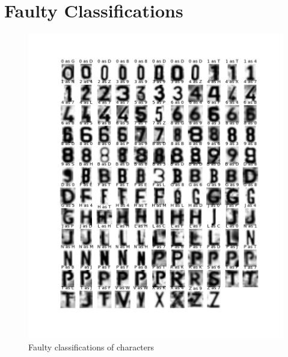 \documentclass[a4paper]{article}
\begin{document}
\section{Faulty Classifications}
\begin{figure}[H]
\center
\includegraphics[scale=0.5]{faulty.png}
\caption{Faulty classifications of characters}
\end{figure}
\end{document}
